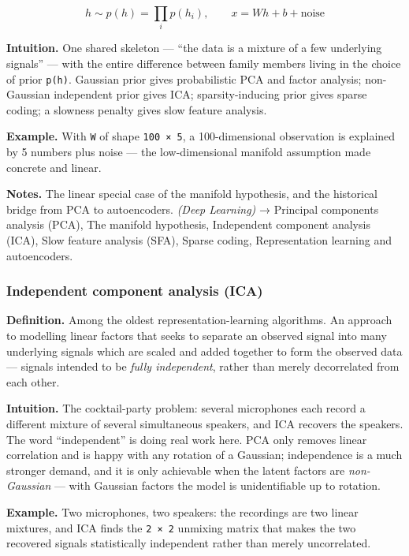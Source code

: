 \documentclass[
  10pt,
  letterpaper,
  onecolumn]{article}
\begin{document}
\begin{equation*}
h\sim p(h)=\prod_i p(h_i),
\qquad
x=Wh+b+\text{noise}
\end{equation*}

\textbf{Intuition.} One shared skeleton --- ``the data is a mixture of a
few underlying signals'' --- with the entire difference between family
members living in the choice of prior \texttt{p(h)}. Gaussian prior
gives probabilistic PCA and factor analysis; non-Gaussian independent
prior gives ICA; sparsity-inducing prior gives sparse coding; a
slowness penalty gives slow feature analysis.

\textbf{Example.} With \texttt{W} of shape \texttt{100\ ×\ 5}, a
100-dimensional observation is explained by 5 numbers plus noise --- the
low-dimensional manifold assumption made concrete and linear.

\textbf{Notes.} The linear special case of the manifold hypothesis, and
the historical bridge from PCA to autoencoders. \emph{(Deep Learning)} →
Principal components analysis (PCA), The manifold hypothesis,
Independent component analysis (ICA), Slow feature analysis (SFA),
Sparse coding, Representation learning and autoencoders.

\hypertarget{independent-component-analysis-ica}{%
\subsubsection{Independent component analysis
(ICA)}\label{independent-component-analysis-ica}}

\textbf{Definition.} Among the oldest representation-learning
algorithms. An approach to modelling linear factors that seeks to
separate an observed signal into many underlying signals which are
scaled and added together to form the observed data --- signals intended
to be \emph{fully independent}, rather than merely decorrelated from
each other.

\textbf{Intuition.} The cocktail-party problem: several microphones each
record a different mixture of several simultaneous speakers, and ICA
recovers the speakers. The word ``independent'' is doing real work here.
PCA only removes linear correlation and is happy with any rotation of a
Gaussian; independence is a much stronger demand, and it is only
achievable when the latent factors are \emph{non-Gaussian} --- with
Gaussian factors the model is unidentifiable up to rotation.

\textbf{Example.} Two microphones, two speakers: the recordings are two
linear mixtures, and ICA finds the \texttt{2\ ×\ 2} unmixing matrix that
makes the two recovered signals statistically independent rather than
merely uncorrelated.
\end{document}
